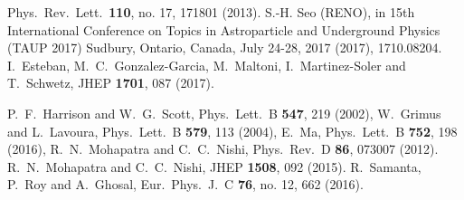 \documentclass[11pt]{article}
\providecommand{\xlink}[1]
  {\href{http://arxiv.org/abs/#1}{arXiv:#1}}
\begin{document}
\begin{thebibliography}{9}
  Phys.\ Rev.\ Lett.\  {\bf 110}, no. 17, 171801 (2013).
 S.-H. Seo (RENO), in
15th International Conference on Topics in Astroparticle and Underground Physics (TAUP 2017) Sudbury, Ontario, Canada, July 24-28, 2017 (2017), 1710.08204.
  I.~Esteban, M.~C.~Gonzalez-Garcia, M.~Maltoni, I.~Martinez-Soler and T.~Schwetz,
  JHEP {\bf 1701}, 087 (2017).
  
   P.~F.~Harrison and W.~G.~Scott,
  Phys.\ Lett.\ B {\bf 547}, 219 (2002),
  W.~Grimus and L.~Lavoura,
  Phys.\ Lett.\ B {\bf 579}, 113 (2004),
 E.~Ma,
  Phys.\ Lett.\ B {\bf 752}, 198 (2016),
   R.~N.~Mohapatra and C.~C.~Nishi,
  Phys.\ Rev.\ D {\bf 86}, 073007 (2012).
  R.~N.~Mohapatra and C.~C.~Nishi,
  JHEP {\bf 1508}, 092 (2015).
  R.~Samanta, P.~Roy and A.~Ghosal,
  Eur.\ Phys.\ J.\ C {\bf 76}, no. 12, 662 (2016).


\end{thebibliography}
\end{document}
